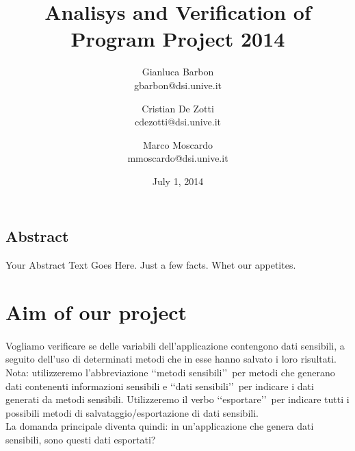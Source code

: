 \documentclass[letterpaper,twocolumn,10pt]{article}
\begin{document}
\title{\Large \bf Analisys and Verification of Program Project 2014}

\author{
{\rm Gianluca Barbon}\\
gbarbon@dsi.unive.it
\and
{\rm Cristian De Zotti}\\
cdezotti@dsi.unive.it
\and
{\rm Marco Moscardo}\\
mmoscardo@dsi.unive.it
}
\date{July 1, 2014}
\maketitle

\thispagestyle{empty}


\subsection*{Abstract}
Your Abstract Text Goes Here.  Just a few facts.
Whet our appetites.


\section{Aim of our project}
\paragraph{}
Vogliamo verificare se delle variabili dell'applicazione contengono dati sensibili, a seguito dell'uso di determinati metodi che in esse hanno salvato i loro risultati.\\ 
Nota: utilizzeremo l'abbreviazione \lq\lq metodi sensibili\rq\rq\ per metodi che generano dati contenenti informazioni sensibili e \lq\lq dati sensibili\rq\rq\ per indicare i dati generati da metodi sensibili. Utilizzeremo il verbo \lq\lq esportare\rq\rq\ per indicare tutti i possibili metodi di salvataggio/esportazione di dati sensibili. \\
La domanda principale diventa quindi: in un'applicazione che genera dati sensibili, sono questi dati esportati? \\

\end{document}
